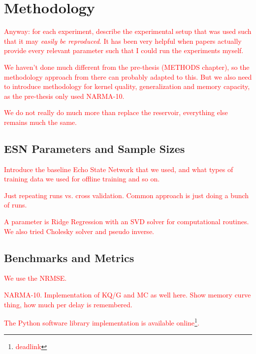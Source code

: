 \chapter{Methodology}

\textcolor{red}{
  Anyway: for each experiment, describe the experimental setup that was used
such that it may \textit{easily be reproduced}. It has been very helpful when
papers actually provide every relevant parameter such that I could run the
experiments myself.
}

\textcolor{red}{
  We haven't done much different from the pre-thesis (METHODS chapter), so the
methodology approach from there can probably adapted to this. But we also need
to introduce methodology for kernel quality, generalization and memory capacity,
as the pre-thesis only used NARMA-10.
}

\textcolor{red}{
  We do not really do much more than replace the reservoir, everything else
remains much the same.
}

\section{ESN Parameters and Sample Sizes}

\textcolor{red}{
  Introduce the baseline Echo State Network that we used, and what types of
training data we used for offline training and so on.
}

\textcolor{red}{
  Just repeating runs vs. cross validation. Common approach is just doing a
bunch of runs.
}

\textcolor{red}{
  A parameter is Ridge Regression with an SVD solver for computational
routines. We also tried Cholesky solver and pseudo inverse.
}

\section{Benchmarks and Metrics}

\textcolor{red}{
  We use the NRMSE.
}

\textcolor{red}{
  NARMA-10. Implementation of KQ/G and MC as well here. Show memory curve thing,
how much per delay is remembered.
}


\textcolor{red}{
  The Python software library implementation is available
online\footnote{\textcolor{red}{deadlink}}.
}

